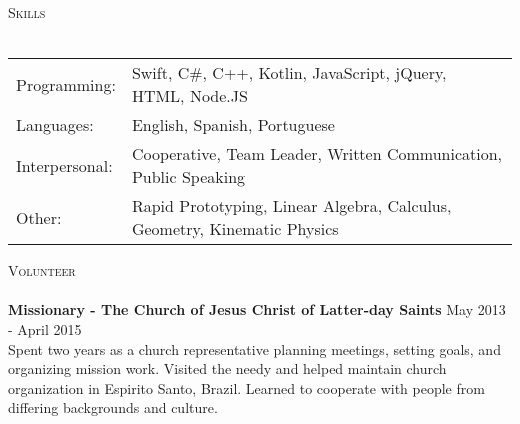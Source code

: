 \documentclass[a4paper]{article}
\newcommand{\lineunder} {
    \vspace*{-8pt} \\
    \hspace*{-18pt} \hrulefill \\
}
\newcommand{\header} [1] {
    {\hspace*{-18pt}\vspace*{6pt} \textsc{#1}}
    \vspace*{-6pt} \lineunder
}
\begin{document}
\header{Skills}
\begin{tabular}{ l l }
    Programming: & Swift, C\#, C++, Kotlin, JavaScript, jQuery, HTML, Node.JS                                                  \\
    Languages:      & English, Spanish, Portuguese                                             \\
    Interpersonal:         & Cooperative, Team Leader, Written Communication, Public Speaking         \\
    Other:                 & Rapid Prototyping, Linear Algebra, Calculus, Geometry, Kinematic Physics \\
\end{tabular}
\vspace{2mm}

\header{Volunteer}
\textbf{Missionary - The Church of Jesus Christ of Latter-day Saints} \hfill May 2013 - April 2015\\
Spent two years as a church representative planning meetings, setting goals, and organizing mission work. Visited the needy and helped maintain church organization in Espirito Santo, Brazil. Learned to cooperate with people from differing backgrounds and culture.\\
\vspace*{2mm}

\ 
\end{document}
